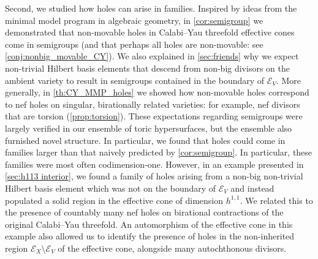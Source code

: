 \documentclass[11pt,dvipsnames]{article}
\theoremstyle{definition}
\begin{document}
Second, we studied how holes can arise in families. Inspired by ideas from the minimal model program in algebraic geometry, in \cref{cor:semigroup} we demonstrated that non-movable holes in Calabi--Yau threefold effective cones come in semigroups (and that perhaps all holes are non-movable: see \cref{conj:nonbig_movable_CY}). We also explained in \cref{sec:friends} why we expect non-trivial Hilbert basis elements that descend from non-big divisors on the ambient variety to result in semigroups contained in the boundary of $\mathcal{E}_V$. More generally, in \cref{th:CY_MMP_holes} we showed how non-movable holes correspond to nef holes on singular, birationally related varieties: for example, nef divisors that are torsion (\cref{prop:torsion}). These expectations regarding semigroups were largely verified in our ensemble of toric hypersurfaces, but the ensemble also furnished novel structure. In particular, we found that holes could come in families larger than that naively predicted by \cref{cor:semigroup}. In particular, these families were most often codimension-one. However, in an example presented in \cref{sec:h113 interior}, we found a family of holes arising from a non-big non-trivial Hilbert basis element which was not on the boundary of $\mathcal{E}_V$ and instead populated a solid region in the effective cone of dimension $h^{1,1}$. We related this to the presence of countably many nef holes on birational contractions of the original Calabi--Yau threefold. An automorphism of the effective cone in this example also allowed us to identify the presence of holes in the non-inherited region $\mathcal{E}_X \setminus \mathcal{E}_V$ of the effective cone, alongside many autochthonous divisors.
\end{document}
